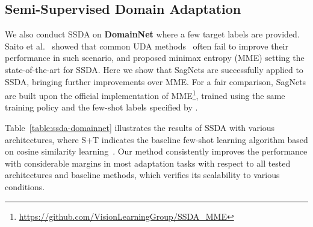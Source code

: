\subsection{Semi-Supervised Domain Adaptation}
\label{sec:exp-ssda} 
We also conduct SSDA on \textbf{DomainNet} where a few target labels are provided.
Saito et al.~\cite{saito2019semi} showed that common UDA methods~\cite{ganin2016domain,mingsheng2018conditional,saito2017adversarial} often fail to improve their performance in such scenario, and proposed minimax entropy (MME) setting the state-of-the-art for SSDA.
Here we show that SagNets are successfully applied to SSDA, bringing further improvements over MME.
For a fair comparison, SagNets are built upon the official implementation of MME\footnote{\scriptsize{\url{https://github.com/VisionLearningGroup/SSDA_MME}}}, trained using the same training policy and the few-shot labels specified by \cite{saito2019semi}.


Table~\ref{table:ssda-domainnet} illustrates the results of SSDA with various architectures, where S+T indicates the baseline few-shot learning algorithm based on cosine similarity learning~\cite{chen2019closerfewshot}. 
Our method consistently improves the performance with considerable margins in most adaptation tasks with respect to all tested architectures and baseline methods, which verifies its scalability to various conditions.



